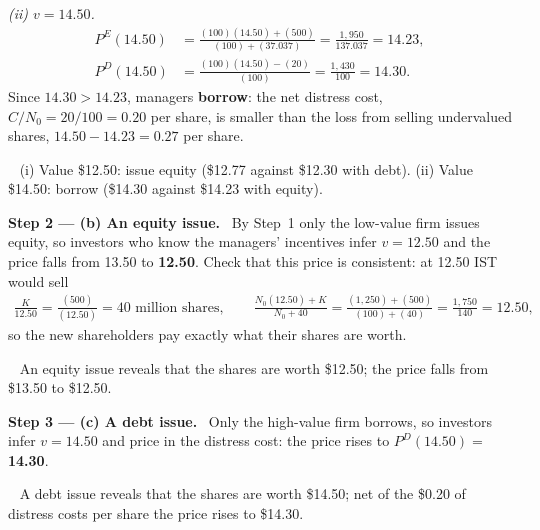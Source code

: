 \documentclass[11pt,a4paper]{article}
\newcommand{\step}[2]{\par\medskip\noindent\textbf{Step #1 --- #2.}~}
\newcommand{\answer}[1]{\par\smallskip\noindent\fbox{\textbf{Answer #1.}}~}
\begin{document}
\textit{(ii) $v=14.50$.}
\begin{align}
  P^E(14.50) &= \frac{(100)(14.50)+(500)}{(100)+(37.037)} = \frac{1{,}950}{137.037} = 14.23, \nonumber\\
  P^D(14.50) &= \frac{(100)(14.50)-(20)}{(100)} = \frac{1{,}430}{100} = 14.30. \nonumber
\end{align}
Since $14.30>14.23$, managers \textbf{borrow}: the net distress cost, $C/N_0=20/100=0.20$ per share, is smaller than the loss from selling undervalued shares, $14.50-14.23=0.27$ per share.

\answer{(a)} (i) Value \$12.50: issue equity (\$12.77 against \$12.30 with debt). (ii) Value \$14.50: borrow (\$14.30 against \$14.23 with equity).

\step{2}{(b) An equity issue} By Step~1 only the low-value firm issues equity, so investors who know the managers' incentives infer $v=12.50$ and the price falls from 13.50 to \textbf{12.50}. Check that this price is consistent: at 12.50 IST would sell
\begin{align}
  \frac{K}{12.50} = \frac{(500)}{(12.50)} = 40 \text{ million shares}, \qquad
  \frac{N_0(12.50)+K}{N_0+40} = \frac{(1{,}250)+(500)}{(100)+(40)} = \frac{1{,}750}{140} = 12.50, \nonumber
\end{align}
so the new shareholders pay exactly what their shares are worth.

\answer{(b)} An equity issue reveals that the shares are worth \$12.50; the price falls from \$13.50 to \$12.50.

\step{3}{(c) A debt issue} Only the high-value firm borrows, so investors infer $v=14.50$ and price in the distress cost: the price rises to $P^D(14.50)=$ \textbf{14.30}.

\answer{(c)} A debt issue reveals that the shares are worth \$14.50; net of the \$0.20 of distress costs per share the price rises to \$14.30.
\end{document}
